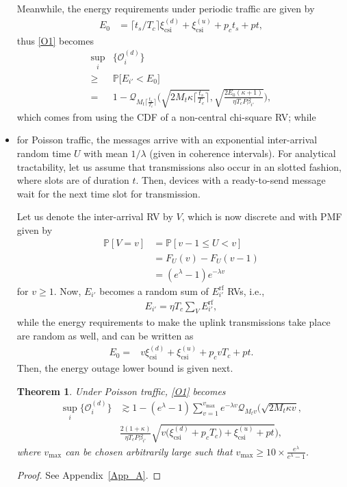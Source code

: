 \documentclass[10pt,journal,a4paper]{IEEEtran}
\newtheorem{theorem}{Theorem}
\begin{document}
\begin{itemize}
		Meanwhile, the energy requirements under periodic traffic are given by
		\begin{align}
		E_0&=\big\lceil t_s/T_c\big\rceil\xi_\mathrm{csi}^{(d)}+\xi_\mathrm{csi}^{(u)}+p_c t_s+p t,
		\end{align}
		thus \eqref{O1} becomes
		\begin{align}
		\sup_i&\{\mathcal{O}_i^{(d)}\}\nonumber\\
		\ge& \mathbb{P}\big[E_{i'}<E_0\big]\nonumber\\
		=& 1\!-\!\mathcal{Q}_{M_t\lceil \frac{t_s}{T_c} \rceil}\!\Bigg(\sqrt{2M_t\kappa\lceil\tfrac{t_s}{T_c}\rceil},\sqrt{\frac{2E_0(\kappa+1)}{\eta T_c P\beta_{i'}}}\Bigg),\label{per}
		\end{align}
		which comes from using the CDF of a non-central chi-square RV; while 
		\item  for Poisson traffic, the messages arrive with an exponential inter-arrival random time $U$ with mean $1/\lambda$ (given in coherence intervals). For analytical tractability, let us assume that transmissions also occur  in an slotted fashion, where slots are of duration $t$. Then, devices with a ready-to-send message wait for the next time slot for transmission. 
		
		Let us denote the inter-arrival RV  by $V$, which is now discrete and with PMF given by
		\begin{align}
		\mathbb{P}[V=v]&=\mathbb{P}[v-1\le U< v]\nonumber\\
		&=F_U(v)-F_U(v-1)\nonumber\\
		&=(e^{\lambda }-1)e^{-\lambda v}\label{Vpdf}
		\end{align}
		for $v\ge 1$. 
		Now, $E_{i'}$ becomes a random sum of $E_{i'}^\mathrm{rf}$ RVs, i.e.,
		\begin{align}
		E_{i'}=\eta T_c\sum\nolimits_V E_{i'}^\mathrm{rf},\label{Ei''}
		\end{align}
	    while the energy requirements to make the uplink transmissions take place are random as well, and can be written as
		\begin{align}
		E_0=&v\xi_\mathrm{csi}^{(d)}+\xi_\mathrm{csi}^{(u)}+p_c vT_c+p t.\label{E0}
		\end{align}
		Then, the energy outage lower bound is given next.
		\begin{theorem}\label{the2}
			Under Poisson traffic, \eqref{O1} becomes
			\begin{align}
			\sup_i\{\mathcal{O}_i^{(d)}\}&\gtrsim 1-(e^\lambda\!-\!1)\!\!\sum_{v=1}^{v_{\max}}\!e^{-\lambda v}\mathcal{Q}_{M_t v}\Big(\!\sqrt{\!2M_t\kappa v},\nonumber\\
			&\!\frac{2(1\!+\!\kappa)}{\eta T_c P\beta_{i'}}\!\sqrt{v\big(\xi_\mathrm{csi}^{(d)}\!+p_cT_c\big)\!+\!\xi_\mathrm{csi}^{(u)}\!+\!p t}\Big),\label{cfO}
			\end{align}
			where $v_{\max}$ can be chosen arbitrarily large such that $v_{\max}\ge 10\times \frac{e^{\lambda}}{e^\lambda-1}$.	
		\end{theorem}
	\begin{proof}
		See Appendix~\ref{App_A}.\phantom\qedhere
	\end{proof}
	\end{itemize}
\end{document}
